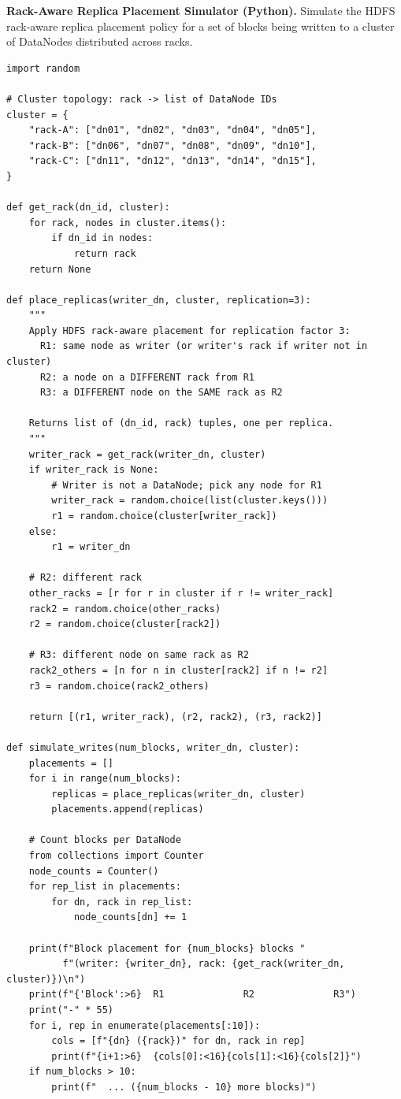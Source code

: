 \pe \textbf{Rack-Aware Replica Placement Simulator (Python).}
Simulate the HDFS rack-aware replica placement policy for a set of
blocks being written to a cluster of DataNodes distributed across racks.

\begin{lstlisting}[style=pyspark, caption={PE3.2: Rack-aware placement simulator}]
import random

# Cluster topology: rack -> list of DataNode IDs
cluster = {
    "rack-A": ["dn01", "dn02", "dn03", "dn04", "dn05"],
    "rack-B": ["dn06", "dn07", "dn08", "dn09", "dn10"],
    "rack-C": ["dn11", "dn12", "dn13", "dn14", "dn15"],
}

def get_rack(dn_id, cluster):
    for rack, nodes in cluster.items():
        if dn_id in nodes:
            return rack
    return None

def place_replicas(writer_dn, cluster, replication=3):
    """
    Apply HDFS rack-aware placement for replication factor 3:
      R1: same node as writer (or writer's rack if writer not in cluster)
      R2: a node on a DIFFERENT rack from R1
      R3: a DIFFERENT node on the SAME rack as R2

    Returns list of (dn_id, rack) tuples, one per replica.
    """
    writer_rack = get_rack(writer_dn, cluster)
    if writer_rack is None:
        # Writer is not a DataNode; pick any node for R1
        writer_rack = random.choice(list(cluster.keys()))
        r1 = random.choice(cluster[writer_rack])
    else:
        r1 = writer_dn

    # R2: different rack
    other_racks = [r for r in cluster if r != writer_rack]
    rack2 = random.choice(other_racks)
    r2 = random.choice(cluster[rack2])

    # R3: different node on same rack as R2
    rack2_others = [n for n in cluster[rack2] if n != r2]
    r3 = random.choice(rack2_others)

    return [(r1, writer_rack), (r2, rack2), (r3, rack2)]

def simulate_writes(num_blocks, writer_dn, cluster):
    placements = []
    for i in range(num_blocks):
        replicas = place_replicas(writer_dn, cluster)
        placements.append(replicas)

    # Count blocks per DataNode
    from collections import Counter
    node_counts = Counter()
    for rep_list in placements:
        for dn, rack in rep_list:
            node_counts[dn] += 1

    print(f"Block placement for {num_blocks} blocks "
          f"(writer: {writer_dn}, rack: {get_rack(writer_dn, cluster)})\n")
    print(f"{'Block':>6}  R1              R2              R3")
    print("-" * 55)
    for i, rep in enumerate(placements[:10]):
        cols = [f"{dn} ({rack})" for dn, rack in rep]
        print(f"{i+1:>6}  {cols[0]:<16}{cols[1]:<16}{cols[2]}")
    if num_blocks > 10:
        print(f"  ... ({num_blocks - 10} more blocks)")


\end{lstlisting}
